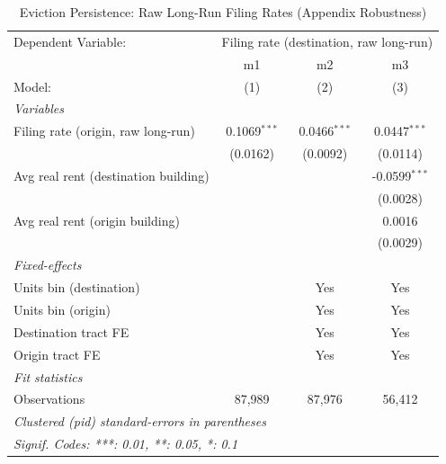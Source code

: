 \begin{table}[htbp]
   \caption{\label{tab:evict_persist_raw} Eviction Persistence: Raw Long-Run Filing Rates (Appendix Robustness)}
   \centering
   \begin{tabular}{lccc}
      \tabularnewline \midrule \midrule
      Dependent Variable: & \multicolumn{3}{c}{Filing rate (destination, raw long-run)}\\
                                           & m1             & m2             & m3 \\   
      Model:                               & (1)            & (2)            & (3)\\  
      \midrule
      \emph{Variables}\\
      Filing rate (origin, raw long-run)   & 0.1069$^{***}$ & 0.0466$^{***}$ & 0.0447$^{***}$\\   
                                           & (0.0162)       & (0.0092)       & (0.0114)\\   
      Avg real rent (destination building) &                &                & -0.0599$^{***}$\\   
                                           &                &                & (0.0028)\\   
      Avg real rent (origin building)      &                &                & 0.0016\\   
                                           &                &                & (0.0029)\\   
      \midrule
      \emph{Fixed-effects}\\
      Units bin (destination)              &                & Yes            & Yes\\  
      Units bin (origin)                   &                & Yes            & Yes\\  
      Destination tract FE                 &                & Yes            & Yes\\  
      Origin tract FE                      &                & Yes            & Yes\\  
      \midrule
      \emph{Fit statistics}\\
      Observations                         & 87,989         & 87,976         & 56,412\\  
      \midrule \midrule
      \multicolumn{4}{l}{\emph{Clustered (pid) standard-errors in parentheses}}\\
      \multicolumn{4}{l}{\emph{Signif. Codes: ***: 0.01, **: 0.05, *: 0.1}}\\
   \end{tabular}
\end{table}

